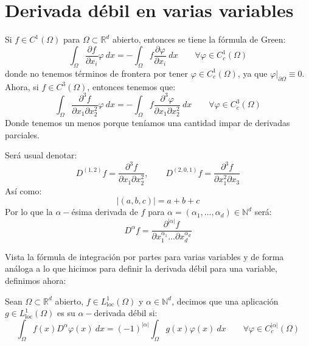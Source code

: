 \section{Derivada débil en varias variables}
\noindent
Si $f\in C^1(\Omega)$ para $\Omega\subset \mathbb{R}^d$ abierto, entonces se tiene la fórmula de Green:
\begin{equation*}
    \int_\Omega \frac{\partial f}{\partial x_i}\varphi~dx = -\int_\Omega f\frac{\partial \varphi}{\partial x_i}~dx \qquad \forall \varphi \in C^1_c(\Omega)
\end{equation*}
donde no tenemos términos de frontera por tener $\varphi \in C^1_c(\Omega)$, ya que $\varphi\big|_{\partial \Omega}\equiv 0$.\\

\noindent
Ahora, si $f\in C^3(\Omega)$, entonces tenemos que:
\begin{equation*}
    \int_\Omega \frac{\partial^3 f}{\partial x_1\partial x_2^2}\varphi~dx = -\int_\Omega f\frac{\partial^3\varphi}{\partial x_1\partial x_2^2}~dx\qquad \forall \varphi \in C_c^3(\Omega)
\end{equation*}
Donde tenemos un menos porque teníamos una cantidad impar de derivadas parciales.

\begin{notacion}
    Será usual denotar:
    \begin{equation*}
        D^{(1,2)} f = \frac{\partial^3 f}{\partial x_1\partial x_2^2}, \qquad D^{(2,0,1)}f = \frac{\partial^3 f}{\partial x_1^2\partial x_3}
    \end{equation*}
    Así como:
    \begin{equation*}
        |(a,b,c)| = a+b+c
    \end{equation*}
    Por lo que la $\alpha-$ésima derivada de $f$ para $\alpha = (\alpha_1,\ldots,\alpha_d)\in \mathbb{N}^d$ será:
    \begin{equation*}
        D^\alpha f =  \frac{\partial^{|\alpha|}f}{\partial x_1^{\alpha_1}\ldots \partial  x_d^{\alpha_d}}
    \end{equation*}
\end{notacion}

\noindent
Vista la fórmula de integración por partes para varias variables y de forma análoga a lo que hicimos para definir la derivada débil para una variable, definimos ahora:
\begin{definicion}
    Sean $\Omega\subset\mathbb{R}^d$ abierto, $f\in L^1_{\text{loc}}(\Omega)$ y $\alpha\in \mathbb{N}^d$, decimos que una aplicación $g\in L^1_{\text{loc}}(\Omega)$ es su $\alpha-$derivada débil si:
    \begin{equation*}
        \int_\Omega f(x)D^{\alpha}\varphi(x)~dx = {(-1)}^{|\alpha|}\int_\Omega g(x)\varphi(x)~dx\qquad \forall \varphi \in C_c^{|\alpha|}(\Omega)
    \end{equation*}
\end{definicion}

